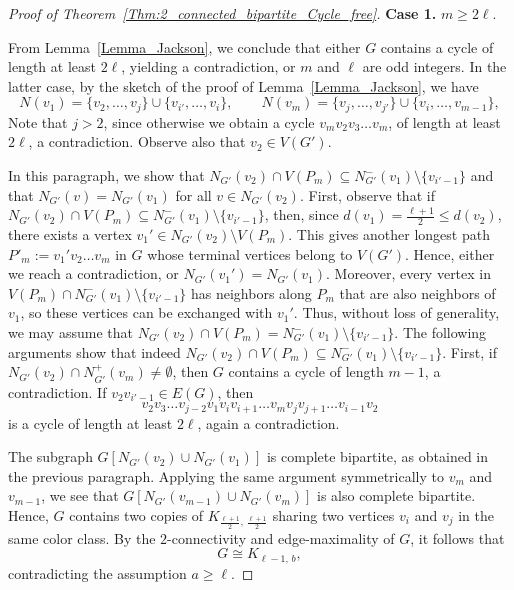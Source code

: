 \documentclass[11pt,a4paper]{article}
\begin{document}
\begin{proof}[Proof of Theorem~\ref{Thm:2_connected_bipartite_Cycle_free}]
\textbf{Case 1.} $m \ge 2\ell$.

From Lemma~\ref{Lemma_Jackson}, we conclude that either $G$ contains a cycle of length at least $2\ell$, yielding a contradiction, or $m$  and $\ell$ are odd integers.  
In the latter case, by the sketch of the proof of Lemma~\ref{Lemma_Jackson}, we have
\[
N(v_1) = \{v_2, \dots, v_j\} \cup \{v_{i'}, \dots, v_i\},
\qquad
N\textbf{}(v_m) = \{v_j, \dots, v_{j'}\} \cup \{v_i, \dots, v_{m-1}\},
\]
Note that $j > 2$, since otherwise we obtain a cycle 
$v_m v_2 v_3 \dots v_m$, of length at least $2\ell$, a contradiction.  
Observe also that $v_2 \in V(G')$.

In this paragraph, we show that 
$N_{G'}(v_2)\cap V(P_m)\subseteq N_{G'}^-(v_1)\setminus \{v_{i'-1}\}$ 
and that $N_{G'}(v)=N_{G'}(v_1)$ for all $v\in N_{G'}(v_2)$.
First, observe that if 
$N_{G'}(v_2)\cap V(P_m)\subseteq N_{G'}^-(v_1)\setminus \{v_{i'-1}\}$, 
then, since $d(v_1)=\tfrac{\ell+1}{2}\le d(v_2)$, 
there exists a vertex $v_1' \in N_{G'}(v_2)\setminus V(P_m)$.  
This gives another longest path 
$P'_m := v_1'v_2\dots v_m$ in $G$ 
whose terminal vertices belong to $V(G')$.  
Hence, either we reach a contradiction, or $N_{G'}(v_1') = N_{G'}(v_1)$.  
Moreover, every vertex in 
$V(P_m)\cap N_{G'}^-(v_1)\setminus \{v_{i'-1}\}$ 
has neighbors along $P_m$ that are also neighbors of $v_1$, 
so these vertices can be exchanged with $v_1'$.  
Thus, without loss of generality, we may assume that 
$N_{G'}(v_2)\cap V(P_m) = N_{G'}^-(v_1)\setminus \{v_{i'-1}\}$.
The following arguments show that indeed 
$N_{G'}(v_2)\cap V(P_m)\subseteq N_{G'}^-(v_1)\setminus \{v_{i'-1}\}$.
First, if $N_{G'}(v_2)\cap N_{G'}^+(v_m)\neq \emptyset$, 
then $G$ contains a cycle of length $m-1$, a contradiction.  
If $v_2v_{i'-1}\in E(G)$, then 
\[
v_2v_3\dots v_{j-2}v_1v_i v_{i+1}\dots v_m v_j v_{j+1}\dots v_{i-1}v_2
\]
is a cycle of length at least $2\ell$, again a contradiction. 

The subgraph $G[N_{G'}(v_2)\cup N_{G'}(v_1)]$ is complete bipartite, 
as obtained in the previous paragraph.
Applying the same argument symmetrically to $v_m$ and $v_{m-1}$, we see that 
$G[N_{G'}(v_{m-1})\cup N_{G'}(v_m)]$ is also complete bipartite.  
Hence, $G$ contains two copies of 
$K_{\frac{\ell + 1}{2},\, \frac{\ell + 1}{2}}$ 
sharing two vertices $v_i$ and $v_j$ in the same color class.  
By the $2$-connectivity and edge-maximality of $G$, it follows that 
\[
G \cong K_{\ell - 1,\, b},
\]
contradicting the assumption $a \ge \ell$.








\end{proof}
\end{document}
